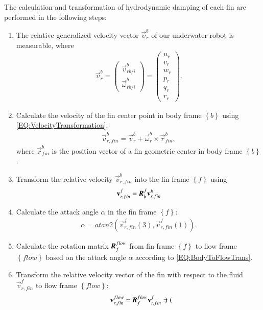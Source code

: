 The calculation and transformation of hydrodynamic damping of each fin are performed in the following steps: 
\begin{enumerate}
\item The relative generalized velocity vector $\vec{\upsilon}_{r}^{b}$ of our underwater robot is measurable,
where 
\begin{align}
\vec{\upsilon}_{r}^{b}=\begin{pmatrix}
\vec{v}^{b}_{rb/i} \\
\vec{\omega}^{b}_{rb/i}
\end{pmatrix}=
\begin{pmatrix}
u_{r}\\v_{r}\\w_{r}\\p_{r}\\q_{r}\\r_{r}
\end{pmatrix}.
\end{align}
\item Calculate the velocity of the fin center point in body frame $\left\{ b \right\}$ using \ref{EQ:VelocityTransformation}:
\begin{align}
\vec{v}_{r,fin}^{b}=\vec{v}_{r}^{b}+\vec{\omega}_{r}^{b}\times \vec{r}^{b}_{fin},
\end{align}
where $\vec{r}^{b}_{fin}$ is the position vector of a fin geometric center in body frame $\left\{ b \right\}$.
\item Transform the relative velocity $\vec{v}_{r,fin}^{b}$ into the fin frame $\left\{ f \right\}$ using
\begin{align}
\vec{v}_{r,fin}^{f}=\emph{\textbf{R}}_{b}^{f}\vec{v}_{r,fin}^{b}
\end{align}
\item Calculate the attack angle $\alpha$ in the fin frame $\left\{ f \right\}$:
\begin{align}
\alpha=atan2(\vec{v}_{r,fin}^{f}(3),\vec{v}_{r,fin}^{f}(1)).
\end{align}
\item Calculate the rotation matrix $\emph{\textbf{R}}^{flow}_{f}$ from fin frame $\left\{ f \right\}$ to flow frame $\left\{ flow \right\}$ based on the attack angle $\alpha$ according to \ref{EQ:BodyToFlowTrans}.
\item Transform the relative velocity vector of the fin with respect to the fluid $\vec{v}_{r,fin}^{f}$ to flow frame $\left\{ flow \right\}$:
\begin{align}
\vec{v}_{r,fin}^{flow}=\emph{\textbf{R}}^{flow}_{f}\vec{v}_{r,fin}^{f}=\begin{pmatrix}

\end{pmatrix}
\end{align}
\end{enumerate}
